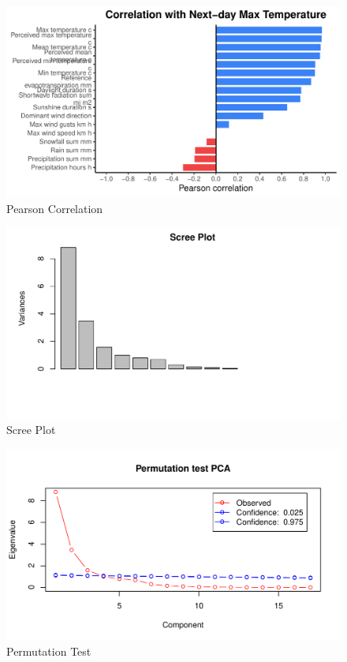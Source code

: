 \documentclass[
]{article}
\begin{document}
\begin{figure}[H]

{\centering \includegraphics[width=0.8\linewidth]{Assignment2_Group9_files/figure-latex/unnamed-chunk-2-1} 

}

\caption{Pearson Correlation}\label{fig:unnamed-chunk-2}
\end{figure}
\begin{figure}[H]

{\centering \includegraphics[width=0.8\linewidth]{Assignment2_Group9_files/figure-latex/unnamed-chunk-3-1} 

}

\caption{Scree Plot}\label{fig:unnamed-chunk-3}
\end{figure}
\begin{figure}[H]

{\centering \includegraphics[width=0.8\linewidth]{Assignment2_Group9_files/figure-latex/unnamed-chunk-4-1} 

}

\caption{Permutation Test}\label{fig:unnamed-chunk-4}
\end{figure}
\end{document}
